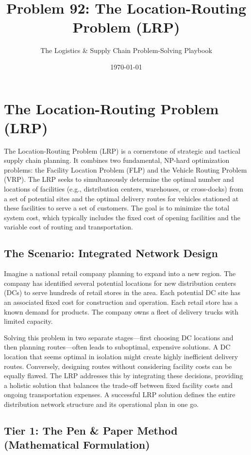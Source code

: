 \documentclass{article}
\title{\textbf{Problem 92: The Location-Routing Problem (LRP)}}
\author{The Logistics \& Supply Chain Problem-Solving Playbook}
\date{\today}
\begin{document}
\maketitle
\tableofcontents
\newpage

\section{The Location-Routing Problem (LRP)}

The Location-Routing Problem (LRP) is a cornerstone of strategic and tactical supply chain planning. It combines two fundamental, NP-hard optimization problems: the Facility Location Problem (FLP) and the Vehicle Routing Problem (VRP). The LRP seeks to simultaneously determine the optimal number and locations of facilities (e.g., distribution centers, warehouses, or cross-docks) from a set of potential sites and the optimal delivery routes for vehicles stationed at these facilities to serve a set of customers. The goal is to minimize the total system cost, which typically includes the fixed cost of opening facilities and the variable cost of routing and transportation.

\subsection{The Scenario: Integrated Network Design}

Imagine a national retail company planning to expand into a new region. The company has identified several potential locations for new distribution centers (DCs) to serve hundreds of retail stores in the area. Each potential DC site has an associated fixed cost for construction and operation. Each retail store has a known demand for products. The company owns a fleet of delivery trucks with limited capacity.

Solving this problem in two separate stages---first choosing DC locations and then planning routes---often leads to suboptimal, expensive solutions. A DC location that seems optimal in isolation might create highly inefficient delivery routes. Conversely, designing routes without considering facility costs can be equally flawed. The LRP addresses this by integrating these decisions, providing a holistic solution that balances the trade-off between fixed facility costs and ongoing transportation expenses. A successful LRP solution defines the entire distribution network structure and its operational plan in one go.

\subsection{Tier 1: The Pen \& Paper Method (Mathematical Formulation)}
\end{document}
